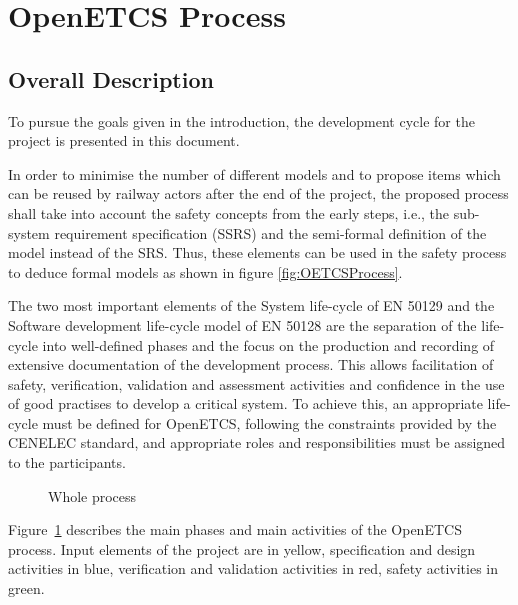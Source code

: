 
\section{OpenETCS Process}


\subsection{Overall Description}
\label{sec:overall_description}


To pursue the goals given in the introduction, the development cycle for the project is presented in this document.

In order to minimise the number of different models and to propose items which can be reused by railway actors after the end of the project, the proposed process shall take into account the safety concepts from the early steps, i.e., the sub-system requirement specification (SSRS) and the semi-formal definition of the model instead of the SRS. Thus, these elements can be used in the safety process to deduce formal models as shown in figure \ref{fig:OETCSProcess}.

The two most important elements of the System life-cycle of EN 50129 and the Software development life-cycle model of EN
50128 are the separation of the life-cycle into well-defined
phases and the focus on the production and recording of extensive documentation of the
development process. This allows facilitation of safety, verification, validation and assessment activities and confidence in the use of good practises to develop a critical system. To achieve this, an appropriate life-cycle
must be defined for OpenETCS, following the constraints provided by the CENELEC standard, and appropriate roles and responsibilities must be assigned to the participants.

 \begin{figure}
  \centering
  \caption{Whole process}
  \label{fig:whole_process}
\end{figure}

Figure~\ref{fig:whole_process} describes the main phases and main activities of the OpenETCS process.
Input elements of the project are in yellow, specification and design activities in blue, verification and validation activities in red, safety activities in green.

